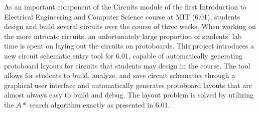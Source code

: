 % 
% 
%

As an important component of the Circuits module of the first Introduction to
Electrical Engineering and Computer Science course at MIT (6.01), students
design and
build several circuits over the course of three weeks. When working on the
more intricate circuits, an unfortunately large proportion of students' lab time
is spent on laying out the circuits on protoboards. This project introduces a
new circuit schematic entry tool for 6.01, capable of automatically generating
protoboard layouts for circuits that students may design in the course. The tool
allows for students to build, analyze, and save circuit schematics through a
graphical user interface and automatically generates protoboard layouts that
are almost always easy to build and debug.
The layout problem is solved by utilizing the $A*$ search algorithm exactly as
presented in 6.01.
